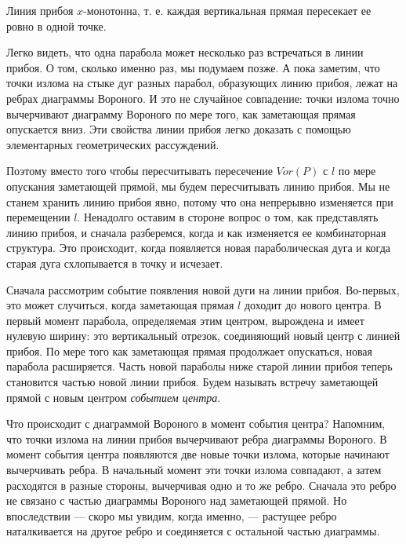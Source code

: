 \begin{observation}
	Линия  прибоя  $x$-монотонна,  т.  е. каждая  вертикальная  прямая  пересекает  ее  ровно  в  одной точке.
\end{observation}

Легко  видеть,  что  одна  парабола  может  несколько раз  встречаться  в  линии  прибоя. 
О  том,  сколько  именно раз,  мы  подумаем  позже. 
А  пока  заметим,  что  точки  излома  на  стыке  дуг  разных  парабол,  образующих  линию прибоя,  лежат  на  ребрах  диаграммы  Вороного.
И  это  не случайное  совпадение:  точки  излома  точно  вычерчивают  диаграмму  Вороного  по  мере  того,  как  заметающая  прямая  опускается  вниз. 
Эти  свойства  линии  прибоя  легко  доказать  с  помощью  элементарных  геометрических  рассуждений.

Поэтому  вместо  того  чтобы  пересчитывать  пересечение  $Vor(P)$  с $l$ по  мере  опускания  заметающей  прямой,  мы  будем  пересчитывать  линию  прибоя.
Мы  не  станем  хранить  линию  прибоя  явно,  потому  что  она  непрерывно  изменяется  при  перемещении $l$.
Ненадолго  оставим  в  стороне  вопрос  о  том,  как  представлять  линию прибоя,  и  сначала  разберемся,  когда  и  как  изменяется  ее  комбинаторная  структура.
Это  происходит,  когда  появляется  новая  параболическая  дуга и  когда  старая дуга  схлопывается  в  точку  и  исчезает.

Сначала  рассмотрим  событие  появления  новой  дуги  на  линии  прибоя.
Во-первых,  это  может  случиться,  когда  заметающая  прямая $l$  доходит  до  нового  центра.
В  первый  момент  парабола,  определяемая  этим  центром,  вырождена  и  имеет нулевую  ширину:  это  вертикальный  отрезок,  соединяющий  новый  центр  с  линией  прибоя.
По  мере  того  как  заметающая  прямая  продолжает  опускаться,  новая парабола  расширяется.
Часть  новой  параболы  ниже  старой  линии  прибоя  теперь становится  частью  новой  линии  прибоя.
Будем называть  встречу  заметающей  прямой  с  новым  центром  \textit{событием  центра}.

Что  происходит  с  диаграммой  Вороного  в  момент  события  центра?
Напомним, что  точки  излома  на  линии  прибоя  вычерчивают  ребра диаграммы  Вороного.
В  момент  события  центра  появляются  две  новые  точки  излома,  которые  начинают  вычерчивать  ребра. 
В  начальный момент  эти  точки  излома  совпадают,  а  затем  расходятся в  разные  стороны,  вычерчивая  одно  и  то  же  ребро.
Сначала  это  ребро  не  связано  с  частью  диаграммы  Вороного над  заметающей  прямой.
Но  впоследствии  ---  скоро  мы увидим,  когда  именно,  ---  растущее  ребро  наталкивается на  другое  ребро  и  соединяется  с  остальной  частью  диаграммы.

